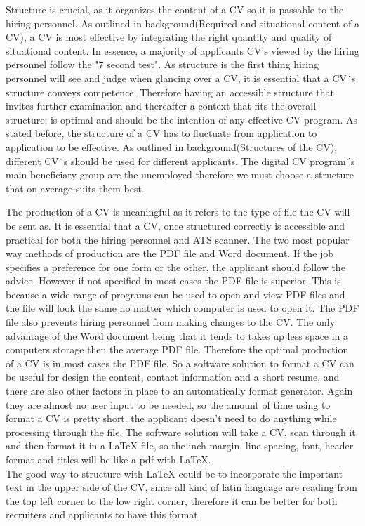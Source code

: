 Structure is crucial, as it organizes the content of a CV so it is passable to the hiring personnel.
As outlined in background(Required and situational content of a CV), a CV is most effective by integrating the right quantity and quality of situational content.
In essence, a majority of applicants CV's viewed by the hiring personnel follow the "7 second test".
As structure is the first thing hiring personnel will see and judge when glancing over a CV, it is essential that a CV´s structure conveys competence.
Therefore having an accessible structure that invites further examination and thereafter a context that fits the overall structure;
is optimal and should be the intention of any effective CV program.
As stated before, the structure of a CV has to fluctuate from application to application to be effective.
As outlined in background(Structures of the CV), different CV´s should be used for different applicants.
The digital CV program´s main beneficiary group are the unemployed therefore we must choose a structure that on average suits them best.

The production of a CV is meaningful as it refers to the type of file the CV will be sent as.
It is essential that a CV, once structured correctly is accessible and practical for both the hiring personnel and ATS scanner.
The two most popular way methods of production are the PDF file and Word document.
If the job specifies a preference for one form or the other, the applicant should follow the advice.
However if not specified in most cases the PDF file is superior.
This is because a wide range of programs can be used to open and view PDF files and the file will look the same no matter which computer is used to open it.
The PDF file also prevents hiring personnel from making changes to the CV. 
The only advantage of the Word document being that it tends to takes up less space in a computers storage then the average PDF file.
Therefore the optimal production of a CV is in most cases the PDF file.
So a software solution to format a CV can be useful for design the content, contact information and a short resume,
and there are also other factors in place to an automatically format generator. Again they are almost no user input to be needed, 
so the amount of time using to format a CV is pretty short. 
the applicant doesn't need to do anything while processing through the file. The software solution will take a CV, scan through it and
then format it in a LaTeX file, so the inch margin, line spacing, font, header format and titles 
will be like a pdf with LaTeX.\\
The good way to structure with LaTeX could be to incorporate the important text in the upper side of the CV, 
since all kind of latin language are reading from the top left corner to the low right corner, therefore it can be better
for both recruiters and applicants to have this format\cite{Pdf_vs_word}.\\

